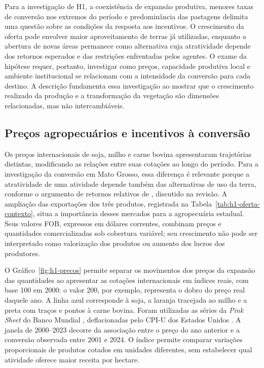 Para a investigação de H1, a coexistência de expansão produtiva, menores taxas de conversão nos extremos do período e predominância das pastagens delimita uma questão sobre as condições da resposta aos incentivos. O crescimento da oferta pode envolver maior aproveitamento de terras já utilizadas, enquanto a abertura de novas áreas permanece como alternativa cuja atratividade depende dos retornos esperados e das restrições enfrentadas pelos agentes. O exame da hipótese requer, portanto, investigar como preços, capacidade produtiva local e ambiente institucional se relacionam com a intensidade da conversão para cada destino. A descrição fundamenta essa investigação ao mostrar que o crescimento realizado da produção e a transformação da vegetação são dimensões relacionadas, mas não intercambiáveis.

\FloatBarrier
\subsection{Preços agropecuários e incentivos à conversão}
\label{subsec:mt-precos}

Os preços internacionais de soja, milho e carne bovina apresentaram trajetórias distintas, modificando as relações entre suas cotações ao longo do período. Para a investigação da conversão em Mato Grosso, essa diferença é relevante porque a atratividade de uma atividade depende também das alternativas de uso da terra, conforme o argumento de retornos relativos de , discutido na revisão. A ampliação das exportações dos três produtos, registrada na Tabela~\ref{tab:h1-oferta-contexto}, situa a importância desses mercados para a agropecuária estadual. Seus valores FOB, expressos em dólares correntes, combinam preços e quantidades comercializadas sob cobertura variável; seu crescimento não pode ser interpretado como valorização dos produtos ou aumento dos lucros dos produtores.

O Gráfico~\ref{fig:h1-precos} permite separar os movimentos dos preços da expansão das quantidades ao apresentar as cotações internacionais em índices reais, com base 100 em 2000: o valor 200, por exemplo, representa o dobro do preço real daquele ano. A linha azul corresponde à soja, a laranja tracejada ao milho e a preta com traços e pontos à carne bovina. Foram utilizadas as séries da \textit{Pink Sheet} do Banco Mundial \cite{WorldBank2026}, deflacionadas pelo CPI-U dos Estados Unidos \cite{BLSCPI2026}. A janela de 2000--2023 decorre da associação entre o preço do ano anterior e a conversão observada entre 2001 e 2024. O índice permite comparar variações proporcionais de produtos cotados em unidades diferentes, sem estabelecer qual atividade oferece maior receita por hectare.

